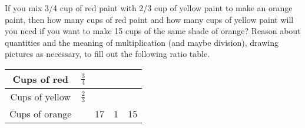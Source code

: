 \documentclass[nooutcomes,noauthor,handout]{ximera}
\begin{document}
\newpage
\begin{problem}
If you mix 3/4 cup of red paint with 2/3 cup of yellow paint to make an orange paint, then how many cups of red paint and how many cups of yellow paint will you need if you want to make 15 cups of the same shade of orange?  Reason about quantities and the meaning of multiplication (and maybe division), drawing pictures as necessary, to fill out the following ratio table. 


\setlength{\tabcolsep}{25pt}
\renewcommand\arraystretch{3}
\begin{tabular}{|c|c|c|c|c|} \hline
Cups of red & $\frac34$  & & &  \\  \hline
Cups of yellow & $\frac23$  &  & & \\  \hline
Cups of orange &  & 17  & 1 & 15  \\  \hline
\end{tabular}



\end{problem}
\end{document}
